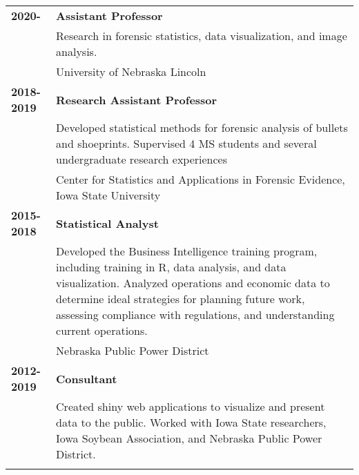 

\newcommand{\ExperienceEntry}[5]{
\textbf{\large\textcolor{materialBlueDark}{#1-}}\textbf{\large\textcolor{materialBlue}{#2}}\hspace{20pt} & \textbf{\large #3}\\
& \normalsize #4\\
& {\small \textcolor{textLightGray}{#5}}\vspace{5pt}\\
}


\begin{tabularx}{.95\textwidth}{l X}

\ExperienceEntry{2020}{}{Assistant Professor}{Research in forensic statistics, data visualization, and image analysis.}{University of Nebraska Lincoln}

\ExperienceEntry{2018}{2019}{Research Assistant Professor}{Developed statistical methods for forensic analysis of bullets and shoeprints. Supervised 4 MS students and several undergraduate research experiences}{Center for Statistics and Applications in Forensic Evidence, Iowa State University}

\ExperienceEntry{2015}{2018}{Statistical Analyst}{Developed the Business Intelligence training program, including training in R, data analysis, and data visualization. Analyzed operations and economic data to determine ideal strategies for planning future work, assessing compliance with regulations, and understanding current operations.}{Nebraska Public Power District}

\ExperienceEntry{2012}{2019}{Consultant}{Created shiny web applications to visualize and present data to the public. Worked with Iowa State researchers, Iowa Soybean Association, and Nebraska Public Power District.}{}

\end{tabularx}
